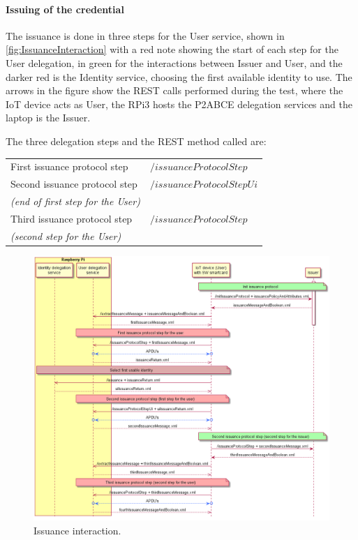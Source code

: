 \paragraph{Issuing of the credential}
The issuance is done in three steps for the User service, shown in \autoref{fig:IssuanceInteraction} with a red note showing the start of each step for the User delegation, in green for the interactions between Issuer and User, and the darker red is the Identity service, choosing the first available identity to use. The arrows in the figure show the REST calls performed during the test, where the IoT device acts as User, the RPi3 hosts the P2ABCE delegation services and the laptop is the Issuer.

The three delegation steps and the REST method called are:

\begin{center}
	\begin{tabular}{l|l}
	First issuance protocol step & $/issuanceProtocolStep$ \\
	Second issuance protocol step  & $/issuanceProtocolStepUi$ \\
	\textit{(end of first step for the User)} & \\
	Third issuance protocol step & $/issuanceProtocolStep$ \\
	\textit{(second step for the User)}  & \\
\end{tabular}
\end{center}


\begin{figure}[bth]
	\begin{center}
		\includegraphics[width=\linewidth]{gfx/IssuanceInteraction}
	\end{center}
	\caption{Issuance interaction.}
	\label{fig:IssuanceInteraction}
\end{figure}



